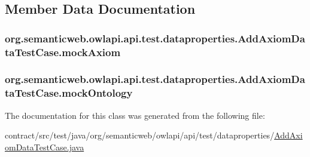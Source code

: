 \subsection{Member Data Documentation}
\hypertarget{classorg_1_1semanticweb_1_1owlapi_1_1api_1_1test_1_1dataproperties_1_1_add_axiom_data_test_case_a1d46eb97da65b2acdc9e7cdfe233e715}{
\subsubsection[{mock\-Axiom}]{ org.\-semanticweb.\-owlapi.\-api.\-test.\-dataproperties.\-Add\-Axiom\-Data\-Test\-Case.\-mock\-Axiom\hspace{0.3cm}{\ttfamily [private]}}}\label{classorg_1_1semanticweb_1_1owlapi_1_1api_1_1test_1_1dataproperties_1_1_add_axiom_data_test_case_a1d46eb97da65b2acdc9e7cdfe233e715}
\hypertarget{classorg_1_1semanticweb_1_1owlapi_1_1api_1_1test_1_1dataproperties_1_1_add_axiom_data_test_case_a95c403264d292a4df6b2940d2eba6d7a}{
\subsubsection[{mock\-Ontology}]{ org.\-semanticweb.\-owlapi.\-api.\-test.\-dataproperties.\-Add\-Axiom\-Data\-Test\-Case.\-mock\-Ontology\hspace{0.3cm}{\ttfamily [private]}}}\label{classorg_1_1semanticweb_1_1owlapi_1_1api_1_1test_1_1dataproperties_1_1_add_axiom_data_test_case_a95c403264d292a4df6b2940d2eba6d7a}


The documentation for this class was generated from the following file\-:\begin{DoxyCompactItemize}
\item 
contract/src/test/java/org/semanticweb/owlapi/api/test/dataproperties/\hyperlink{_add_axiom_data_test_case_8java}{Add\-Axiom\-Data\-Test\-Case.\-java}\end{DoxyCompactItemize}
